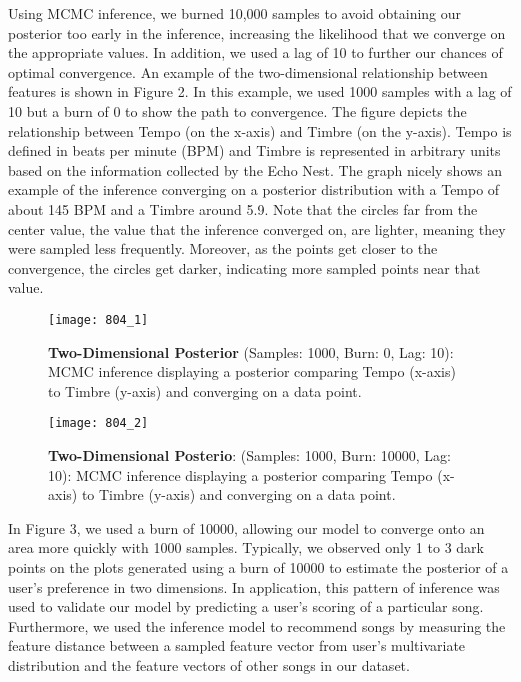 \documentclass{amsart}
\theoremstyle{plain}
\theoremstyle{definition}
\begin{document}
  	Using MCMC inference, we burned 10,000 samples to avoid obtaining our posterior too early in the inference, increasing the likelihood that we converge on the appropriate values. In addition, we used a lag of 10 to further our chances of optimal convergence. An example of the two-dimensional relationship between features is shown in Figure 2. In this example, we used 1000 samples with a lag of 10 but a burn of 0 to show the path to convergence. The figure depicts the relationship between Tempo (on the x-axis) and Timbre (on the y-axis). Tempo is defined in beats per minute (BPM) and Timbre is represented in arbitrary units based on the information collected by the Echo Nest. The graph nicely shows an example of the inference converging on a posterior distribution with a Tempo of about 145 BPM and a Timbre around 5.9. Note that the circles far from the center value, the value that the inference converged on, are lighter, meaning they were sampled less frequently. Moreover, as the points get closer to the convergence, the circles get darker, indicating more sampled points near that value.
  	   	
  	\begin{figure}[h]
  		\centering
  		\texttt{[image: 804\_1]}
  		\caption{\textbf{Two-Dimensional Posterior} (Samples: 1000, Burn: 0, Lag: 10): MCMC inference displaying a posterior comparing Tempo (x-axis) to Timbre (y-axis) and converging on a data point.}
  		\label{fig:804_1}
  	\end{figure}
  
   	\begin{figure}[h]
	  	\centering
	  	\texttt{[image: 804\_2]}
	  	\caption{\textbf{Two-Dimensional Posterio}: (Samples: 1000, Burn: 10000, Lag: 10): MCMC inference displaying a posterior comparing Tempo (x-axis) to Timbre (y-axis) and converging on a data point.}
	  	\label{fig:804_2}
  	\end{figure}
  	
  	In Figure 3, we used a burn of 10000, allowing our model to converge onto an area more quickly with 1000 samples. Typically, we observed only 1 to 3 dark points on the plots generated using a burn of 10000 to estimate the posterior of a user's preference in two dimensions. In application, this pattern of inference was used to validate our model by predicting a user's scoring of a particular song. Furthermore, we used the inference model to recommend songs by measuring the feature distance between a sampled feature vector from user's multivariate distribution and the feature vectors of other songs in our dataset.
  	
\end{document}
